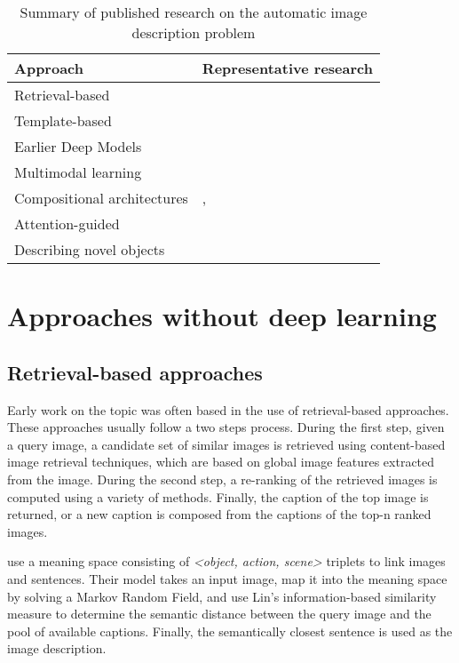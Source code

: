 \begin{table}[hpt]
    \caption{Summary of published research on the automatic image description problem}
    \label{tab:classification}
    \begin{tabular}{p{40mm}|p{120mm}}
        Approach & Representative research \\
        \hline
        Retrieval-based & \citet{Farhadi2010, Ordonez2011, Gupta2012, Kuznetsova2012, Hodosh2013a, Kuznetsova2014, Mason2015, Hodosh2013b}\\
        Template-based &  \citet{Yang2011, Kulkarni2011, Li2011, Mitchell2012, Ushiku2015}\\
        Earlier Deep Models &  \citet{Socher2014, Karpathy2014, Ma2016, Yan2015, Lebret2015a}\\
        Multimodal learning & \citet{Kiros2014a, Mao2015a, Karpathy2015, Chen2015}\\
        Compositional architectures & \citet{Fang2015, Tran2016, Ma2016, Oruganti2016, Wang2016, Fu2017},\\
        Attention-guided & \citet{Xu2015, You2016, Yang2016, Zhou2017, Cao2019, He2019}\\
        Describing novel objects & \citet{Mao2015b, Hendricks2016} 
    \end{tabular}
\end{table}

\section{Approaches without deep learning}

\subsection{Retrieval-based approaches}

Early work on the topic was often based in the use of retrieval-based approaches. These approaches usually follow a two steps process. During the first step, given a query image, a candidate set of similar images is retrieved using content-based image retrieval techniques, which are based on global image features extracted from the image. During the second step, a re-ranking of the retrieved images is computed using a variety of methods. Finally, the caption of the top image is returned, or a new caption is composed from the captions of the top-n ranked images.

\citet{Farhadi2010} use a meaning space consisting of \textit{<object, action, scene>} triplets to link images and sentences. Their model takes an input image, map it into the meaning space by solving a Markov Random Field, and use Lin's information-based similarity measure \citep{Lin1998} to determine the semantic distance between the query image and the pool of available captions. Finally, the semantically closest sentence is used as the image description.

